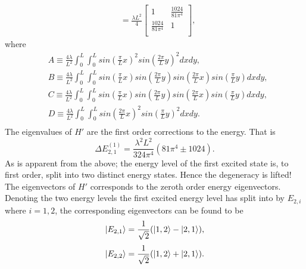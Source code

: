 \begin{example}
\begin{enumerate}
\begin{equation}
\begin{split}
				&=\frac{\lambda L^2}{4}\begin{bmatrix}
					1& \frac{1024}{81\pi^4}\\
					\frac{1024}{81\pi^4} & 1\\
				\end{bmatrix},
			\end{split}
		\end{equation} 
		where
		\begin{equation}
			\begin{split}
				&A\equiv \frac{4\lambda}{L^2}\int_{0}^{L}\int_{0}^{L} sin(\frac{\pi}{L}x)^2sin(\frac{2\pi}{L}y)^2dxdy,\\
				&B\equiv \frac{4\lambda}{L^2}\int_{0}^{L}\int_{0}^{L} sin(\frac{\pi}{L}x)sin(\frac{2\pi}{L}y)sin(\frac{2\pi}{L}x)sin(\frac{\pi}{L}y)dxdy,\\
				&C\equiv \frac{4\lambda}{L^2}\int_{0}^{L}\int_{0}^{L} sin(\frac{\pi}{L}x)sin(\frac{2\pi}{L}y)sin(\frac{2\pi}{L}x)sin(\frac{\pi}{L}y)dxdy, \\
				&D\equiv \frac{4\lambda}{L^2}\int_{0}^{L}\int_{0}^{L} sin(\frac{2\pi}{L}x)^2sin(\frac{\pi}{L}y)^2dxdy.\\		
			\end{split}
		\end{equation}
		The eigenvalues of $H'$ are the first order corrections to the energy. That is
		\begin{equation}
			\Delta E_{2,1}^{(1)}=\frac{\lambda^2L^2}{324\pi^4}(81\pi^4\pm 1024).
			\label{FPE2}
		\end{equation} 
		As is apparent from the above; the energy level of the first excited state is, to first order, split into two distinct energy states. Hence the degeneracy is lifted! \newline
		The eigenvectors of $H'$ corresponds to the zeroth order energy eigenvectors. Denoting the two energy levels the first excited energy level has split into by $E_{2,i}$ where $i=1,2$, the corresponding eigenvectors can be found to be
		\begin{equation}
			\ket{E_{2,1}}=\frac{1}{\sqrt{2}}(\ket{1,2}-\ket{2,1}),
		\end{equation} 
		\begin{equation}
			\ket{E_{2,2}}=\frac{1}{\sqrt{2}}(\ket{1,2}+\ket{2,1}).
		\end{equation} 
		
	\end{enumerate}
\end{example}

